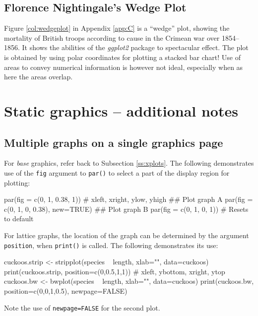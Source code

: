 \documentclass{tufte-book}\usepackage[]{graphicx}\usepackage[]{color}
\newcommand{\txtt}[1]{\texttt{#1}}
\begin{document}
\subsection*{Florence Nightingale's Wedge Plot}

Figure \ref{col:wedgeplot} in Appendix \ref{app:C} is a ``wedge''
plot, showing the mortality of British troops according to cause in
the Crimean war over 1854--1856. It shows the abilities of the {\em
  ggplot2} package to spectacular effect.  The plot is obtained by
using polar coordinates for plotting a stacked bar chart!  Use of
areas to convey numerical information is however not ideal, especially
when as here the areas overlap.


\section{Static graphics -- additional notes}
\subsection{Multiple graphs on a single graphics page}\label{ssec:xgph}

For \textit{base} graphics, refer back to Subsection \ref{ss:xplots}.
The following demonstrates use of the \txtt{fig}
argument to \txtt{par()} to select a part of the display region
for plotting:
\begin{Schunk}
\begin{Sinput}
par(fig = c(0, 1, 0.38, 1))
          # xleft, xright, ylow, yhigh
## Plot graph A
par(fig = c(0, 1, 0, 0.38), new=TRUE)
## Plot graph B
par(fig = c(0, 1, 0, 1))     # Resets to default
\end{Sinput}
\end{Schunk}
For lattice graphs, the location of the graph can be determined
by the argument \txtt{position}, when \txtt{print()} is called.
The following demonstrates its use:
\begin{fullwidth}
\begin{Schunk}
\begin{Sinput}
cuckoos.strip <- stripplot(species ~ length, xlab="", data=cuckoos)
print(cuckoos.strip, position=c(0,0.5,1,1))
                   # xleft, ybottom, xright, ytop
cuckoos.bw <- bwplot(species ~ length, xlab="", data=cuckoos)
print(cuckoos.bw, position=c(0,0,1,0.5), newpage=FALSE)
\end{Sinput}
\end{Schunk}
\end{fullwidth}
\noindent
Note the use of \txtt{newpage=FALSE} for the second plot.
\end{document}
